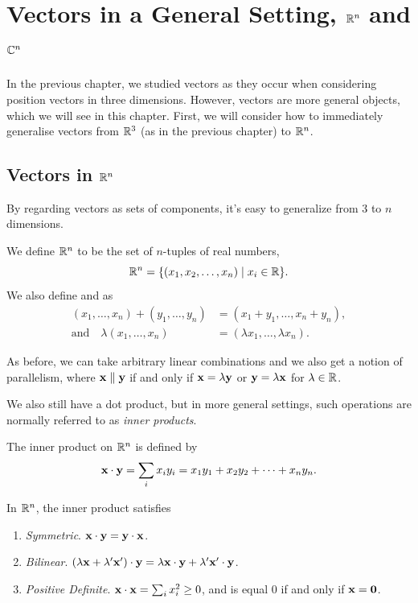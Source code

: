 \documentclass[a4paper]{scrartcl}
\begin{document}
\section{Vectors in a General Setting, $\R^n$ and $\mathbb{C}^n$}

In the previous chapter, we studied vectors as they occur when considering position vectors in three dimensions. However, vectors are more general objects, which we will see in this chapter. First, we will consider how to immediately generalise vectors from $\mathbb{R}^3$ (as in the previous chapter) to $\R^n$.

\subsection{Vectors in $\R^n$}

By regarding vectors as sets of components, it's easy to generalize from 3 to $n$ dimensions.

\begin{definition}[$\R^n$ Space]
    We define $\R^n$ to be the set of $n$-tuples of real numbers,
    $$
    \mathbb{R}^n = \{(x_1, x_2, \dots, x_n) \mid x_i \in \mathbb{R}\}.
    $$ 
    We also define  and  as
    \begin{align*}
        (x_1, \dots, x_n) + (y_1, \dots, y_n) &= (x_1 + y_1, \dots, x_n + y_n),\\
       \text{and} \quad \lambda (x_1, \dots, x_n) &= (\lambda x_1, \dots, \lambda x_n).
    \end{align*}
\end{definition}

As before, we can take arbitrary linear combinations and we also get a notion of parallelism, where $\mathbf{x} \parallel \mathbf{y}$ if and only if $\mathbf{x} = \lambda \mathbf{y}$ or $\mathbf{y} = \lambda \mathbf{x}$ for $\lambda \in \mathbb{R}$.

We also still have a dot product, but in more general settings, such operations are normally referred to as \emph{inner products}.

\begin{definition}
    The inner product on $\R^n$ is defined by
    $$
    \mathbf{x} \cdot \mathbf{y} = \sum_{i} x_i y_i = x_1 y_1 + x_2 y_2 + \cdots + x_n y_n.
    $$
\end{definition}

\begin{proposition}
    In $\R^n$, the inner product satisfies
    \begin{enumerate}[label=(\roman*)]
        \item \emph{Symmetric}. $\mathbf{x} \cdot \mathbf{y} = \mathbf{y} \cdot \mathbf{x}$.
        \item \emph{Bilinear}. $(\lambda \mathbf{x} + \lambda' \mathbf{x}') \cdot \mathbf{y} = \lambda \mathbf{x} \cdot \mathbf{y} + \lambda' \mathbf{x}' \cdot \mathbf{y}$.
        \item \emph{Positive Definite}. $\mathbf{x} \cdot \mathbf{x} = \sum_{i} x_i ^2 \geq 0$, and is equal 0 if and only if $\mathbf{x} = \mathbf{0}$. 
    \end{enumerate}
\end{proposition}
\end{document}
